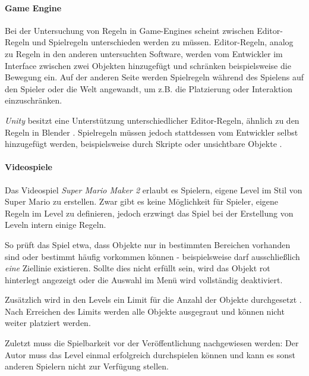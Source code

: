 \paragraph{Game Engine}

Bei der Untersuchung von Regeln in Game-Engines scheint zwischen Editor-Regeln und Spielregeln unterschieden werden zu müssen. Editor-Regeln, analog zu Regeln in den anderen untersuchten Software, werden vom Entwickler im Interface zwischen zwei Objekten hinzugefügt und schränken beispielsweise die Bewegung ein. Auf der anderen Seite werden Spielregeln während des Spielens auf den Spieler oder die Welt angewandt, um z.B. die Platzierung oder Interaktion einzuschränken.

\textit{Unity} besitzt eine Unterstützung unterschiedlicher Editor-Regeln, ähnlich zu den Regeln in Blender \parencite{techhamlinLookConstraintsUnity2024}. Spielregeln müssen jedoch stattdessen vom Entwickler selbst hinzugefügt werden, beispielsweise durch Skripte oder unsichtbare Objekte \parencite{yeopBuiltRuleBasedAutoPlacement2025}. 

\paragraph{Videospiele}

Das Videospiel \textit{Super Mario Maker 2} erlaubt es Spielern, eigene Level im Stil von Super Mario zu erstellen. Zwar gibt es keine Möglichkeit für Spieler, eigene Regeln im Level zu definieren, jedoch erzwingt das Spiel bei der Erstellung von Leveln intern einige Regeln. \parencite{dr.badbeardSuperMarioMaker2019}

So prüft das Spiel etwa, dass Objekte nur in bestimmten Bereichen vorhanden sind oder bestimmt häufig vorkommen können - beispielsweise darf ausschließlich \textit{eine} Ziellinie existieren. Sollte dies nicht erfüllt sein, wird das Objekt rot hinterlegt angezeigt oder die Auswahl im Menü wird vollständig deaktiviert.

Zusätzlich wird in den Levels ein Limit für die Anzahl der Objekte durchgesetzt \parencite{gamexplainPushingObjectLimit2015}. Nach Erreichen des Limits werden alle Objekte ausgegraut und können nicht weiter platziert werden.

Zuletzt muss die Spielbarkeit vor der Veröffentlichung nachgewiesen werden: Der Autor muss das Level einmal erfolgreich durchspielen können und kann es sonst anderen Spielern nicht zur Verfügung stellen. 

\medskip


